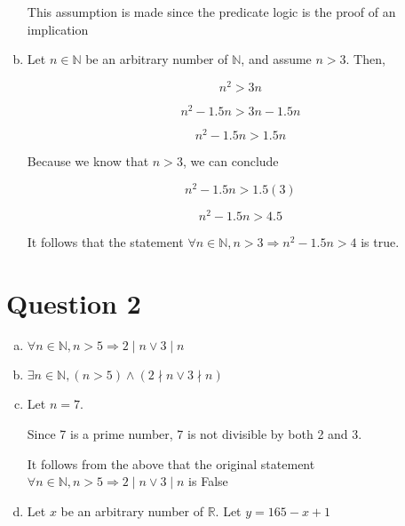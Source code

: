 \documentclass[12pt]{article}
\begin{document}
\begin{enumerate}[a.]
    This assumption is made since the predicate logic is the proof of an implication

    \item

    Let $n \in \mathbb{N}$ be an arbitrary number of $\mathbb{N}$, and assume $n > 3$. Then,

    \setcounter{equation}{0}
    \begin{equation}
        n^2 > 3n
    \end{equation}

    \begin{equation}
        n^2 -1.5n > 3n - 1.5n
    \end{equation}

    \begin{equation}
        n^2 -1.5n > 1.5n
    \end{equation}

    Because we know that $n > 3$, we can conclude

    \begin{equation}
        n^2 -1.5n > 1.5(3)
    \end{equation}

    \begin{equation}
        n^2 -1.5n > 4.5
    \end{equation}

    It follows that the statement $\forall n \in \mathbb{N}, n > 3 \Rightarrow n^2 - 1.5n > 4$ is true.

\end{enumerate}

\section*{Question 2}
\begin{enumerate}[a.]
    \item $\forall n \in \mathbb{N}, n > 5 \Rightarrow 2 \mid n \lor 3 \mid n$
    \item $\exists n \in \mathbb{N}, (n > 5) \land (2 \nmid n \lor 3 \nmid n)$
    \item

    Let $n = 7$.

    Since 7 is a prime number, 7 is not divisible by both 2 and 3.

    It follows from the above that the original statement $\forall n \in \mathbb{N}, n > 5 \Rightarrow 2 \mid n \lor 3 \mid n$ is False

    \item

    Let $x$ be an arbitrary number of $\mathbb{R}$. Let $y = 165 - x + 1$
\end{enumerate}
\end{document}
